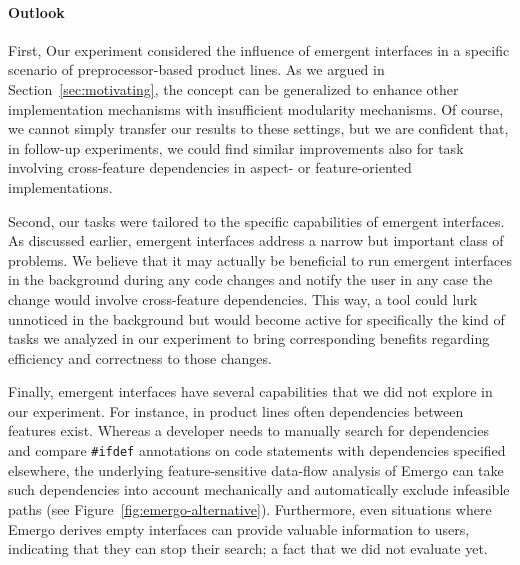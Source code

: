 
\paragraph{Outlook}
\label{sec:outlook}
First, Our experiment considered the influence of emergent interfaces in a specific scenario of preprocessor-based product lines. As we argued in Section~\ref{sec:motivating}, the concept can be generalized to enhance other implementation mechanisms with insufficient modularity mechanisms. Of course, we cannot simply transfer our results to these settings, but we are confident that, in follow-up experiments, we could find similar improvements also for task involving cross-feature dependencies in aspect- or feature-oriented implementations.

Second, our tasks were tailored to the specific capabilities of emergent interfaces. As discussed earlier, emergent interfaces address a narrow but important class of problems. We believe that it may actually be beneficial to run emergent interfaces in the background during any code changes and notify the user in any case the change would involve cross-feature dependencies. This way, a tool could lurk unnoticed in the background but would become active for specifically the kind of tasks we analyzed in our experiment to bring corresponding benefits regarding efficiency and correctness to those changes.

Finally, emergent interfaces have several capabilities that we did not explore in our experiment. For instance, in product lines often dependencies between features exist. Whereas a developer needs to manually search for dependencies and compare \texttt{\#ifdef} annotations on code statements with dependencies specified elsewhere, the underlying feature-sensitive data-flow analysis of Emergo can take such dependencies into account mechanically and automatically exclude infeasible paths (see Figure~\ref{fig:emergo-alternative}). Furthermore, even situations where Emergo derives empty interfaces can provide valuable information to users, indicating that they can stop their search; a fact that we did not evaluate yet.

